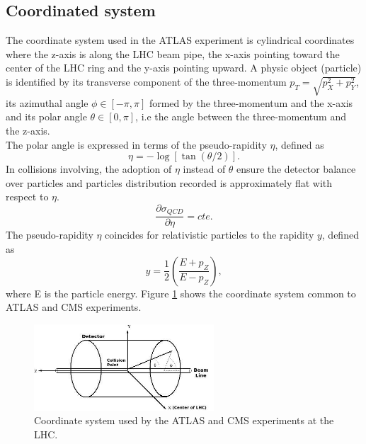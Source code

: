 \subsection{Coordinated system}
\label{chap2:ATLAS:CS}
The coordinate system used in the ATLAS experiment is cylindrical coordinates where the z-axis is along the LHC beam pipe, the x-axis pointing toward the center of the LHC ring and the y-axis pointing upward. A physic object (particle) is identified by its transverse component of the three-momentum $p_T = \sqrt{p_X^2 + p_Y^2}$, its azimuthal angle $\phi \in [-\pi,\pi] $ formed by the three-momentum and the x-axis and its polar angle $\theta \in [0,\pi]$, i.e the angle between the three-momentum and the z-axis. \\
The polar angle is expressed in terms of the pseudo-rapidity $\eta$, defined as
\begin{equation}
\eta = -\log[\tan(\theta/2)].
\end{equation}
In collisions involving, the adoption of $\eta$ instead of $\theta$ ensure the detector balance over particles and particles distribution recorded is approximately flat with respect to $\eta$.
\begin{equation}
\frac{\partial\sigma_{QCD}}{\partial\eta} = cte.
\end{equation}
The pseudo-rapidity $\eta$ coincides for relativistic particles to the rapidity $y$, defined as 
\begin{equation}
y = \frac{1}{2}(\frac{E+p_Z}{E-p_Z}),
\end{equation}
where E is the particle energy.
Figure \ref{fig:chap2:ATLAS:SYS} shows the coordinate system common to ATLAS and CMS experiments.
\begin{figure}[ht]
    \centering
    \includegraphics[width=0.6\textwidth]{Ch2/Img/ATLAS_Sys.jpeg}
    \caption{Coordinate system used by the ATLAS and CMS experiments at the LHC.}
    \label{fig:chap2:ATLAS:SYS}
\end{figure}


